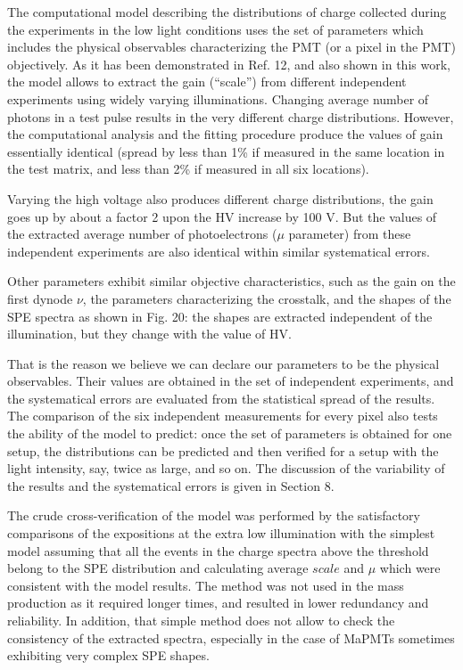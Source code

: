\documentclass[11pt]{report}
\begin{document}
{\centering
\begin{tcolorbox}[enlarge top by=2em,colbacktitle=green!60!white,colframe=black!80!white,width=0.9\linewidth,left=30pt,right=30pt,top=10pt,bottom=10pt,boxrule=0.3pt,title=\bfseries our draft remarks]


The computational model describing the distributions of charge collected during the experiments in the low light conditions uses the set of parameters which includes the physical observables characterizing the PMT (or a pixel in the PMT) objectively. As it has been demonstrated in Ref. 12, and also shown in this work, the model allows to extract the gain (``scale'') from different independent experiments using widely varying illuminations. Changing average number of photons in a test pulse results in the very different charge distributions. However, the computational analysis and the fitting procedure produce the values of gain essentially identical (spread by less than 1\% if measured in the same location in the test matrix, and less than 2\% if measured in all six locations). 


Varying the high voltage also produces different charge distributions, the gain goes up by about a factor 2 upon the HV increase by 100 V. But the values of the extracted average number of photoelectrons ($\mu$ parameter) from these independent experiments are also identical within similar systematical errors. 

Other parameters exhibit similar objective characteristics, such as the gain on the first dynode $\nu$, the parameters characterizing the crosstalk, and the shapes of the SPE spectra as shown in Fig. 20: the shapes are extracted independent of the illumination, but they change with the value of HV.

That is the reason we believe we can declare our parameters to be the physical observables. Their values are obtained in the set of independent experiments, and the systematical errors are evaluated from the statistical spread of the results. The comparison of the six independent measurements for every pixel also tests the ability of the model to predict: once the set of parameters is obtained for one setup, the distributions can be predicted and then verified for a setup with the light intensity, say, twice as large, and so on. The discussion of the variability of the results and the systematical errors is given in Section 8.

The crude cross-verification of the model was performed by the satisfactory comparisons of the expositions at the extra low illumination with the simplest model assuming that all the events in the charge spectra above the threshold belong to the SPE distribution and calculating average $scale$ and $\mu$ which were consistent with the model results. The method was not used in the mass production as it required longer times, and resulted in lower redundancy and reliability. In addition, that simple method does not allow to check the consistency of the extracted spectra, especially in the case of MaPMTs sometimes exhibiting very complex SPE shapes.    


\end{tcolorbox}}
\end{document}
